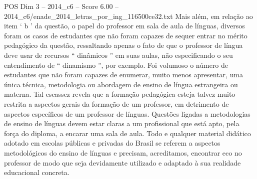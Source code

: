 \begin{textsample}{POS Dim 3 – 2014\_c6 – Score 6.00 – 2014\_c6/enade\_2014\_letras\_por\_ing\_116500ce32.txt}
Mais além, em relação ao item ‘ b ’ da questão, o papel do professor em sala de aula de línguas, diversos foram os casos de estudantes que não foram capazes de sequer entrar no mérito pedagógico da questão, ressaltando apenas o fato de que o professor de língua deve usar de recursos “ dinâmicos ” em suas aulas, não especificando o seu entendimento de “ dinamismo ”, por exemplo.
Foi volumoso o número de estudantes que não foram capazes de enumerar, muito menos apresentar, uma única técnica, metodologia ou abordagem de ensino de língua estrangeira ou materna.
Tal escassez revela que a formação pedagógica esteja talvez muito restrita a aspectos gerais da formação de um professor, em detrimento de aspectos específicos de um professor de línguas.
Questões ligadas a metodologias de ensino de línguas devem estar claras a um profissional que está apto, pela força do diploma, a encarar uma sala de aula.
Todo e qualquer material didático adotado em escolas públicas e privadas do Brasil se referem a aspectos metodológicos do ensino de línguas e precisam, acreditamos, encontrar eco no professor de modo que seja devidamente utilizado e adaptado à sua realidade educacional concreta.

\end{textsample}
